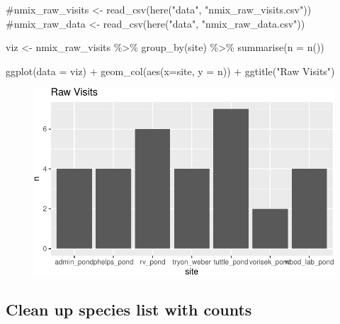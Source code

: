 \documentclass[
  letterpaper,
  DIV=11,
  numbers=noendperiod]{scrartcl}
\newenvironment{Shaded}{\begin{snugshade}}{\end{snugshade}}
\newcommand{\AttributeTok}[1]{\textcolor[rgb]{0.40,0.45,0.13}{#1}}
\newcommand{\CommentTok}[1]{\textcolor[rgb]{0.37,0.37,0.37}{#1}}
\newcommand{\FunctionTok}[1]{\textcolor[rgb]{0.28,0.35,0.67}{#1}}
\newcommand{\NormalTok}[1]{\textcolor[rgb]{0.00,0.23,0.31}{#1}}
\newcommand{\OtherTok}[1]{\textcolor[rgb]{0.00,0.23,0.31}{#1}}
\newcommand{\SpecialCharTok}[1]{\textcolor[rgb]{0.37,0.37,0.37}{#1}}
\newcommand{\StringTok}[1]{\textcolor[rgb]{0.13,0.47,0.30}{#1}}
\begin{document}
\begin{Shaded}
\begin{Highlighting}[]
\CommentTok{\#nmix\_raw\_visits \textless{}{-} read\_csv(here("data", "nmix\_raw\_visits.csv"))}
\CommentTok{\#nmix\_raw\_data \textless{}{-} read\_csv(here("data", "nmix\_raw\_data.csv"))}


\NormalTok{viz }\OtherTok{\textless{}{-}}\NormalTok{ nmix\_raw\_visits }\SpecialCharTok{\%\textgreater{}\%} 
  \FunctionTok{group\_by}\NormalTok{(site) }\SpecialCharTok{\%\textgreater{}\%} 
  \FunctionTok{summarise}\NormalTok{(}\AttributeTok{n =} \FunctionTok{n}\NormalTok{())}

\FunctionTok{ggplot}\NormalTok{(}\AttributeTok{data =}\NormalTok{ viz) }\SpecialCharTok{+}
  \FunctionTok{geom\_col}\NormalTok{(}\FunctionTok{aes}\NormalTok{(}\AttributeTok{x=}\NormalTok{site, }\AttributeTok{y =}\NormalTok{ n)) }\SpecialCharTok{+}
  \FunctionTok{ggtitle}\NormalTok{(}\StringTok{"Raw Visits"}\NormalTok{)}
\end{Highlighting}
\end{Shaded}

\begin{figure}[H]

{\centering \includegraphics{cmr_penn_files/figure-pdf/unnamed-chunk-4-1.pdf}

}

\end{figure}

\newpage

\hypertarget{clean-up-species-list-with-counts}{%
\subsection{Clean up species list with
counts}\label{clean-up-species-list-with-counts}}
\end{document}
